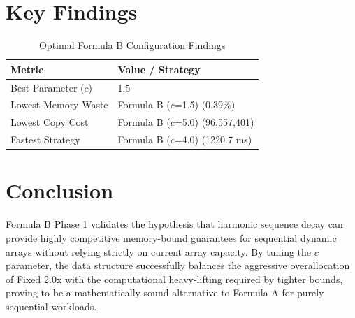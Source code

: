 \documentclass[11pt, a4paper]{article}
\begin{document}
\section{Key Findings}

\begin{table}[H]
\centering
\caption{Optimal Formula B Configuration Findings}
\begin{tabular}{ll}
\toprule
\textbf{Metric} & \textbf{Value / Strategy} \\
\midrule
Best Parameter ($c$) & 1.5 \\
Lowest Memory Waste & Formula B ($c$=1.5) (0.39\%) \\
Lowest Copy Cost & Formula B ($c$=5.0) (96,557,401) \\
Fastest Strategy & Formula B ($c$=4.0) (1220.7 ms) \\
\bottomrule
\end{tabular}
\end{table}

\section{Conclusion}
Formula B Phase 1 validates the hypothesis that harmonic sequence decay can provide highly competitive memory-bound guarantees for sequential dynamic arrays without relying strictly on current array capacity. By tuning the $c$ parameter, the data structure successfully balances the aggressive overallocation of Fixed 2.0x with the computational heavy-lifting required by tighter bounds, proving to be a mathematically sound alternative to Formula A for purely sequential workloads.
\end{document}
